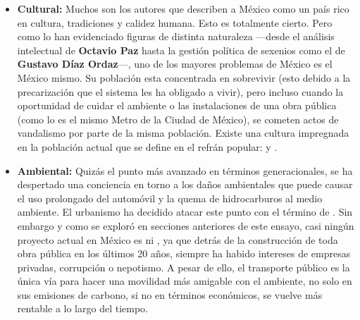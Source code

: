 \begin{itemize}
    \item \textbf{Cultural:} Muchos son los autores que describen a México como un país rico en cultura, tradiciones y calidez humana. Esto es 
            totalmente cierto. Pero como lo han evidenciado figuras de distinta naturaleza ---desde el análisis intelectual de \textbf{Octavio Paz} hasta la gestión política de sexenios como el de \textbf{Gustavo Díaz Ordaz}---, uno de los mayores problemas de México es el México mismo. Su población esta concentrada en sobrevivir 
            (esto debido a la precarización que el sistema les ha obligado a vivir), pero incluso cuando la oportunidad de cuidar el ambiente o las instalaciones 
            de una obra pública (como lo es el mismo Metro de la Ciudad de México), se cometen actos de vandalismo por parte de la misma población. 
            Existe una cultura impregnada en la población actual que se define en el refrán popular:  y 
            .

    \item \textbf{Ambiental:} Quizás el punto más avanzado en términos generacionales, se ha despertado una conciencia en torno a los daños ambientales que 
            puede causar el uso prolongado del automóvil y la quema de hidrocarburos al medio ambiente. El urbanismo ha decidido atacar este punto 
            con el término de . Sin embargo y como se exploró en secciones anteriores de este ensayo, casi ningún proyecto actual 
            en México es  ni , ya que detrás de la construcción de toda obra pública en los últimos 20 años, siempre 
            ha habido intereses de empresas privadas, corrupción o nepotismo. A pesar de ello, el transporte público es la única vía para hacer una 
            movilidad más amigable con el ambiente, no solo en sus emisiones de carbono, si no en términos económicos, se vuelve más rentable a lo largo del tiempo.


\end{itemize}
